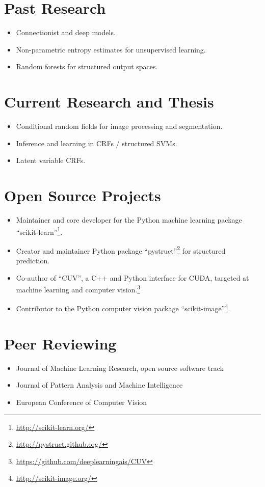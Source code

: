 \documentclass[a4paper,11pt]{article}
\begin{document}
\section{Past Research}
\begin{itemize}
    \item Connectionist and deep models.
    \item Non-parametric entropy estimates for unsupervised learning.
    \item Random forests for structured output spaces.
\end{itemize}

\section{Current Research and Thesis}
\begin{itemize}
    \item Conditional random fields for image processing and segmentation.
    \item Inference and learning in CRFs / structured SVMs.
    \item Latent variable CRFs.
\end{itemize}

\section{Open Source Projects}
\begin{itemize}
    \item Maintainer and core developer for the Python machine learning package ``scikit-learn''\footnote{\url{http://scikit-learn.org/}}.
    \item Creator and maintainer Python package ``pystruct''\footnote{\url{http://pystruct.github.org/}} for structured prediction.
    \item Co-author of ``CUV'', a C++ and Python interface for CUDA,
        targeted at machine learning and computer vision.\footnote{\url{https://github.com/deeplearningais/CUV}}
    \item Contributor to the Python computer vision package ``scikit-image''\footnote{\url{http://scikit-image.org/}}.
\end{itemize}
\pagebreak

\section{Peer Reviewing}
\begin{itemize}
    \item Journal of Machine Learning Research, open source software track
    \item Journal of Pattern Analysis and Machine Intelligence
    \item European Conference of Computer Vision
\end{itemize}
\end{document}
